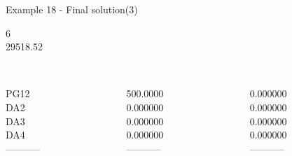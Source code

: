 \begin{frame}{Example 18 - Final solution(3)}

 6 \\
  29518.52\\

\begin{columns}[t]
\begin{column}{0.3\textwidth}
\\

PG12\\
DA2\\
DA3\\
DA4\\
-----------\\
\end{column}
\begin{column}{0.3\textwidth}
\\
500.0000\\
0.000000\\
0.000000\\
0.000000\\
-----------\\
\end{column}  

\begin{column}{0.3\textwidth}
\\
0.000000\\
0.000000\\
0.000000\\
0.000000\\
-----------\\
\end{column}
\end{columns}
\end{frame}


